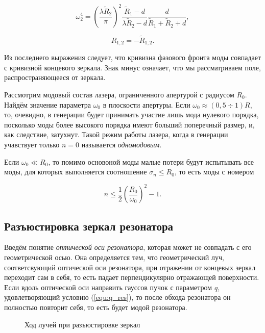 \documentclass[a4paper,12pt]{article}
\begin{document}
\begin{equation}
    \omega_2^4 = (\frac{\lambda \tilde{R}_2}{\pi})^2 \frac{\tilde{R}_1 - d}{\lambda\tilde{R}_2 - d}\frac{d}{\tilde{R}_1 + \tilde{R}_2 + d},
\end{equation}

\begin{equation}
    R_{1,2} = -\tilde{R}_{1,2}.
\end{equation}

Из последнего выражения следует, что кривизна фазового фронта моды совпадает с кривизной концевого зеркала. Знак минус означает, что мы рассматриваем поле, распространяющееся от зеркала.

Рассмотрим модовый состав лазера, ограниченного апертурой с радиусом $R_0$. Найдём значение параметра $\omega_0$ в плоскости апертуры. Если $\omega_0 \approx (0,5 \div 1)R$, то, очевидно, в генерации будет принимать участие лишь мода нулевого порядка, посколько моды более высокого порядка имеют больший поперечный размер, и, как следствие, затухнут. Такой режим работы лазера, когда в генерации учавствует только $n = 0$ называется \textit{одномодовым}.

Если $\omega_0 \ll R_0$, то помимо основоной моды малые потери будут испытывать все моды, для которых выполняется соотношение $\sigma_n \leq R_0$, то есть моды с номером

\begin{equation}
    n \leq \frac{1}{2}(\frac{R_0}{\omega_0})^2 - 1.
\end{equation}

\subsection{Разъюстировка зеркал резонатора}

Введём понятие \textit{оптической оси резонатора}, которая может не совпадать с его геометрической осью. Она определяется тем, что геометрический луч, соответсвующий оптической оси резонатора, при отражении от концевых зеркал переходит сам в себя, то есть падает перпендикулярно отражающей поверхности. Если вдоль оптической оси направить гауссов пучок с параметром $q$, удовлетворяющий условию (\ref{equ:q_res}), то после обхода резонатора он полностью повторит себя, то есть будет модой резонатора.

\begin{figure}[h!]
    \caption{Ход лучей при разъюстировке зеркал}
    \label{fig:disjunction}
\end{figure}
\end{document}
